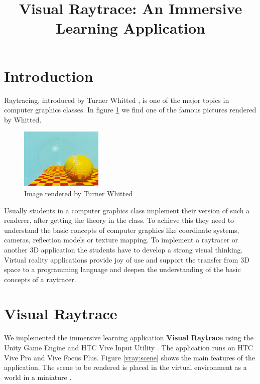 \documentclass{VRARWorkshop}
\title{Visual Raytrace: An Immersive Learning Application}
\begin{document}

\section{Introduction}
Raytracing, introduced by Turner Whitted \cite{whitted_80}, is one of the major topics in
computer graphics classes.
In figure \ref{intro:whitted} we find one of the famous pictures rendered by Whitted.

\begin{figure}[h!]
    \begin{center}
        \includegraphics[width=0.35\textwidth]{whitted02.jpg}
        \caption{\label{intro:whitted} Image rendered by Turner Whitted \cite{checkerSpheres}}
    \end{center}
\end{figure}
Usually students in a computer graphics class implement their version of such a renderer,
after getting the theory in the class.
To achieve this they need to understand the basic concepts of computer graphics like coordinate systems,
cameras, reflection models or texture mapping. To implement a raytracer or another 3D application the students have to
develop a strong visual thinking. Virtual reality applications provide joy of use and support the transfer
from 3D space to a programming language and deepen the understanding of the basic concepts of a raytracer.
%
\section{Visual Raytrace}
We implemented the immersive learning application \textbf{Visual Raytrace} \cite{saerota_21, visualraytrace} using the Unity Game Engine
and HTC Vive Input Utility \cite{viveInput}.
The application runs on HTC Vive Pro and Vive Focus Plus.
Figure \ref{vray:scene} shows the main features of the application.
The scene to be rendered is placed in the virtual environment as a world in a miniature \cite{pausch_95}.
\end{document}
